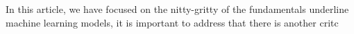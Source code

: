 In this article, we have focused on the nitty-gritty of the fundamentals underline machine learning models, it is important to address that there is another critc